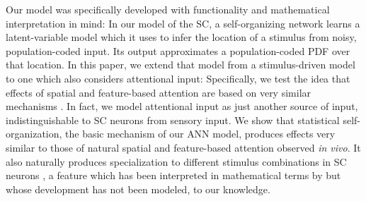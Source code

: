 Our model was specifically developed with functionality and mathematical interpretation in mind:
In our model of the \ac{SC}, a self-organizing network learns a latent-variable model which it uses to infer the location of a stimulus from noisy, population-coded input.
Its output approximates a population-coded \ac{PDF} over that location.
In this paper, we extend that model from a stimulus-driven model to one which also considers attentional input:
Specifically, we test the idea that effects of spatial and feature-based attention are based on very similar mechanisms \citep{maunsell-and-treue-2006}.
In fact, we model attentional input as just another source of input, indistinguishable to \ac{SC} neurons from sensory input.
We show that statistical self-organization, the basic mechanism of our \ac{ANN} model, produces effects very similar to those of natural spatial and feature-based attention observed \emph{in vivo}.
It also naturally produces specialization to different stimulus combinations in \ac{SC} neurons \citep{wallace-and-stein-1996,stein-2012}, a feature which has been interpreted in mathematical terms by \citet{colonius-and-diederich-2004} but whose development has not been modeled, to our knowledge.

